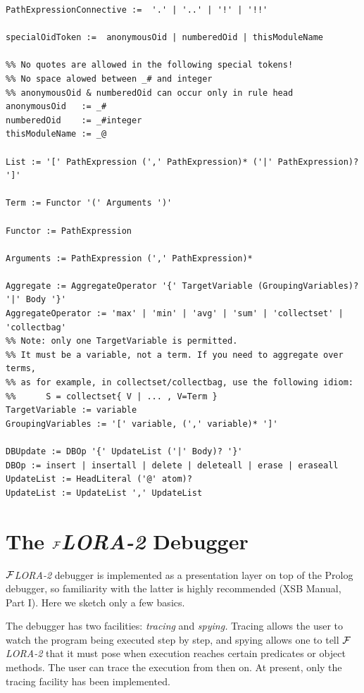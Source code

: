 \documentclass[11pt]{article}
\newcommand{\FLORA}{{\mbox{${\cal F}${\small\it LORA}\rm\emph{-2}}}\xspace}
\begin{document}
\begin{verbatim}
PathExpressionConnective :=  '.' | '..' | '!' | '!!'

specialOidToken :=  anonymousOid | numberedOid | thisModuleName

%% No quotes are allowed in the following special tokens!
%% No space alowed between _# and integer
%% anonymousOid & numberedOid can occur only in rule head
anonymousOid   := _#
numberedOid    := _#integer
thisModuleName := _@

List := '[' PathExpression (',' PathExpression)* ('|' PathExpression)? ']'

Term := Functor '(' Arguments ')'

Functor := PathExpression

Arguments := PathExpression (',' PathExpression)*

Aggregate := AggregateOperator '{' TargetVariable (GroupingVariables)? '|' Body '}'
AggregateOperator := 'max' | 'min' | 'avg' | 'sum' | 'collectset' | 'collectbag'
%% Note: only one TargetVariable is permitted.
%% It must be a variable, not a term. If you need to aggregate over terms,
%% as for example, in collectset/collectbag, use the following idiom:
%%      S = collectset{ V | ... , V=Term }
TargetVariable := variable
GroupingVariables := '[' variable, (',' variable)* ']'

DBUpdate := DBOp '{' UpdateList ('|' Body)? '}'
DBOp := insert | insertall | delete | deleteall | erase | eraseall
UpdateList := HeadLiteral ('@' atom)?
UpdateList := UpdateList ',' UpdateList  
\end{verbatim}


\section{The \FLORA Debugger}\label{sec-debugger}


\FLORA debugger is implemented as a presentation layer on top of the Prolog
debugger, so familiarity with the latter is highly recommended (XSB Manual,
Part I). Here we sketch only a few basics.

The debugger has two facilities: \emph{tracing} and \emph{spying.} Tracing
allows the user to watch the program being executed step by step, and
spying allows one to tell \FLORA that it must pose when execution reaches
certain predicates or object methods. The user can trace the execution from
then on. At present, only the tracing facility has been implemented.

\end{document}
